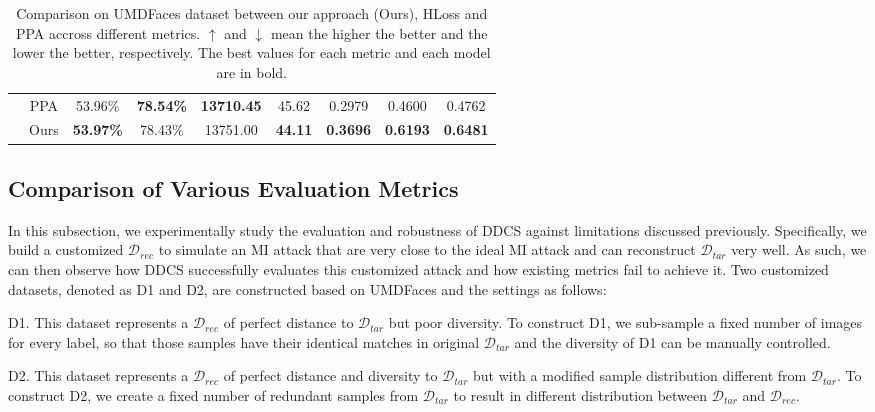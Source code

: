 \begin{table*}[htb]
{\begin{tabular}{ | c | c | c c c c c | c c | }
        & PPA & 53.96\% & \bf 78.54\% & \bf 13710.45 & 45.62 & 0.2979 & 0.4600 & 0.4762 \\
		& Ours & \bf 53.97\% & 78.43\% & 13751.00 & \bf 44.11 & \bf 0.3696 & \bf 0.6193 & \bf 0.6481 \\
		\hline
	\end{tabular}
    }
	\caption{Comparison on UMDFaces dataset between our approach (Ours), HLoss and PPA accross different metrics. $\uparrow$ and $\downarrow$ mean the higher the better and the lower the better, respectively. The best values for each metric and each model are in bold.}
	\label{exp:result:umdfaces}
\end{table*}


\subsection{Comparison of Various Evaluation Metrics}
In this subsection, we experimentally study the evaluation and robustness of DDCS against limitations discussed previously.
Specifically, we build a customized $\mathcal{D}_{rec}$ to simulate an MI attack that are very close to the ideal MI attack and can reconstruct $\mathcal{D}_{tar}$ very well.
As such, we can then observe how DDCS successfully evaluates this customized attack and how existing metrics fail to achieve it.
Two customized datasets, denoted as D1 and D2, are constructed based on UMDFaces and the settings as follows:

\noindent
D1. \quad
This dataset represents a $\mathcal{D}_{rec}$ of perfect distance to $\mathcal{D}_{tar}$ but poor diversity. To construct D1, we sub-sample a fixed number of images for every label, so that those samples have their identical matches in original $\mathcal{D}_{tar}$ and the diversity of D1 can be manually controlled.

\noindent
D2.\quad
This dataset represents a $\mathcal{D}_{rec}$ of perfect distance and diversity to $\mathcal{D}_{tar}$ but with a modified sample distribution different from $\mathcal{D}_{tar}$. To construct D2, we create a fixed number of redundant samples from $\mathcal{D}_{tar}$ to result in different distribution between $\mathcal{D}_{tar}$ and $\mathcal{D}_{rec}$.

